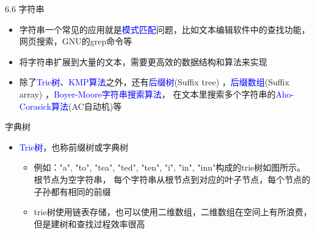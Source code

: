\begin{frame}{6.6 字符串}
    \begin{itemize}
        \item 字符串一个常见的应用就是\textcolor{blue}{模式匹配}问题，比如文本编辑软件中的查找功能，网页搜索，GNU的grep命令等
        \vfill
        \item 将字符串扩展到大量的文本，需要更高效的数据结构和算法来实现
        \vfill
        \item 除了\textcolor{blue}{Trie树}、\textcolor{blue}{KMP算法}之外，还有\textcolor{blue}{后缀树}(Suffix tree) ，\textcolor{blue}{后缀数组}(Suffix array) ，\textcolor{blue}{Boyer-Moore字符串搜索算法}， 在文本里搜索多个字符串的\textcolor{blue}{Aho-Corasick算法}(AC自动机)等
    \end{itemize}
\end{frame}
\begin{frame}{字典树}
    \begin{itemize}
        \item \textcolor{blue}{Trie树}，也称前缀树或字典树
        \begin{itemize}
            \item 例如："a", "to", "tea", "ted", "ten", "i", "in", "inn"构成的trie树如图所示。根节点为空字符串， 每个字符串从根节点到对应的叶子节点，每个节点的子孙都有相同的前缀
            \item trie树使用链表存储，也可以使用二维数组，二维数组在空间上有所浪费，但是建树和查找过程效率很高
        \end{itemize}
    \end{itemize}    
    \begin{center}
    \end{center}
\end{frame}
